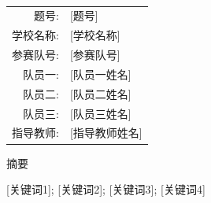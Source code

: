 \documentclass[zihao=-4,a4paper]{ctexart}
\begin{document}
\begin{titlepage}
  \begin{center}
    \vspace*{2.0cm}
    {\Huge\heiti [论文标题]}\\[2.5cm]

    {\large
      \begin{tabular}{rl}
        题号:         & [题号] \\[0.8em]
        学校名称:     & [学校名称] \\[0.8em]
        参赛队号:     & [参赛队号] \\[0.8em]
        队员一:       & [队员一姓名] \\[0.8em]
        队员二:       & [队员二姓名] \\[0.8em]
        队员三:       & [队员三姓名] \\[0.8em]
        指导教师:     & [指导教师姓名] \\
      \end{tabular}}
    \vfill
  \end{center}
\end{titlepage}


\begin{center}
  {\Large\heiti 摘\quad 要}
\end{center}


\vspace{1em}
 [关键词1]; [关键词2]; [关键词3]; [关键词4]

\newpage


\end{document}
